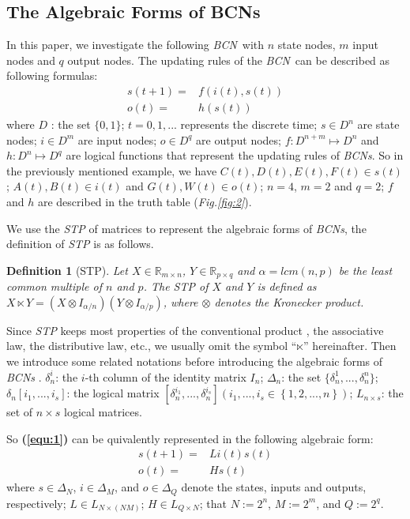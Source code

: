 \documentclass[conference]{IEEEtran} %
\newtheorem{definition}{Definition}
\def \BCN {{\em BCN}}
\begin{document}
\subsection{The Algebraic Forms of BCNs}
In this paper, we investigate the following \BCN\ with $n$ state nodes, $m$ input nodes and $q$ output nodes. The updating rules of the \BCN\ can be described as following formulas:
\begin{equation}
\begin{split}
s(t+1)=&f(i(t),s(t))\\
o(t)=&h(s(t))
\end{split}
\label{equ:1}
\end{equation}
where $D$ : the set $\{0,1\}$; $t=0,1,...$ represents the discrete time; $s\in D^n$ are state nodes; $i\in D^m$ are input nodes; $o\in D^q$ are output nodes; $f:D^{n+m}\mapsto D^n$ and $h:D^n\mapsto D^q$ are logical functions that represent the updating rules of {\em BCNs}. So in the previously mentioned example, we have $C(t), D(t), E(t), F(t)\in s(t)$; $A(t), B(t)\in i(t)$ and $G(t), W(t)\in o(t)$; $n=4$, $m=2$ and $q=2$; $f$ and $h$ are described in the truth table ({\em Fig.\ref{fig:2}}). 

We use the {\em STP} of matrices to represent the algebraic forms of {\em BCNs}, the definition of {\em STP} is as follows.

\begin{definition}[STP] 
	\cite{Cheng2011Analysis} Let $X\in\mathbb{R}_{m\times n}$, $Y\in\mathbb{R}_{p\times q}$ and $\alpha=lcm(n,p)$ be the least common multiple of $n$ and $p$. The STP of $X$ and $Y$ is defined as $X\ltimes Y=(X\otimes I_{\alpha/n})(Y\otimes I_{\alpha/p})$, where $\otimes$ denotes the Kronecker product. 
\end{definition}

Since {\em STP} keeps most properties of the conventional product \cite{Cheng2011Analysis}, the associative law, the distributive law, etc., we usually omit the symbol ``$\ltimes$'' hereinafter. Then we introduce some related notations before introducing the algebraic forms of {\em BCNs} . $\delta^i_n$: the $i$-th column of the identity matrix $I_n$; $\Delta_n$: the set $\{\delta^1_n,...,\delta^n_n \}$; $\delta_n \left[i_1,...,i_s\right]$: the logical matrix $\left[\delta^{i_1}_n,...,\delta^{i_s}_n\right]\left(i_1,...,i_s\in\left\{1,2,...,n\right\}\right)$; $L_{n\times s}$: the set of $n\times s$ logical matrices. \cite{Zhang2016Observability}

So {\bf (\ref{equ:1})} can be quivalently represented in the following algebraic form:
\begin{equation}
\begin{split}
s(t+1)=&Li(t)s(t)\\
o(t)=&Hs(t)
\end{split}
\label{equ:2}
\end{equation}
where $s\in\Delta_N$, $i\in\Delta_M$, and  $o\in\Delta_Q$ denote the states, inputs and outputs, respectively; $L\in L_{N\times\left(NM\right)}$; $H\in L_{Q\times N}$; that $N:=2^n$, $M:=2^m$, and $Q:=2^q$. 
\end{document}
